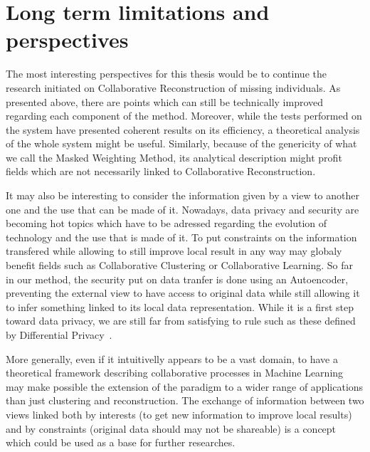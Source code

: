 \section{Long term limitations and perspectives}

The most interesting perspectives for this thesis would be to continue the research initiated on Collaborative Reconstruction of missing individuals. As presented above, there are points which can still be technically improved regarding each component of the method. Moreover, while the tests performed on the system have presented coherent results on its efficiency, a theoretical analysis of the whole system might be useful. Similarly, because of the genericity of what we call the Masked Weighting Method, its analytical description might profit fields which are not necessarily linked to Collaborative Reconstruction.

It may also be interesting to consider the information given by a view to another one and the use that can be made of it. Nowadays, data privacy and security are becoming hot topics which have to be adressed regarding the evolution of technology and the use that is made of it. To put constraints on the information transfered while allowing to still improve local result in any way may globaly benefit fields such as Collaborative Clustering or Collaborative Learning. So far in our method, the security put on data tranfer is done using an Autoencoder, preventing the external view to have access to original data while still allowing it to infer something linked to its local data representation. While it is a first step toward data privacy, we are still far from satisfying to rule such as these defined by Differential Privacy~\cite{dwork2010differential}.

More generally, even if it intuitivelly appears to be a vast domain, to have a theoretical framework describing collaborative processes in Machine Learning may make possible the extension of the paradigm to a wider range of applications than just clustering and reconstruction. The exchange of information between two views linked both by interests (to get new information to improve local results) and by constraints (original data should may not be shareable) is a concept which could be used as a base for further researches.

